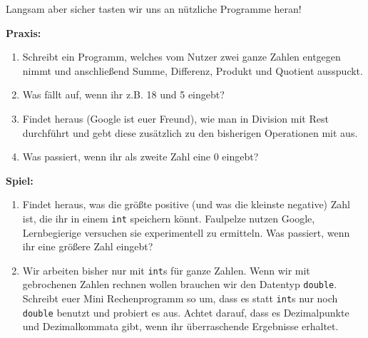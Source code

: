 
Langsam aber sicher tasten wir uns an nützliche Programme heran!

\textbf{Praxis:}
\begin{enumerate}[resume]
    \item Schreibt ein Programm, welches vom Nutzer zwei ganze Zahlen entgegen
        nimmt und anschließend Summe, Differenz, Produkt und Quotient
        ausspuckt.
    \item Was fällt auf, wenn ihr z.B. 18 und 5 eingebt?
    \item Findet heraus (Google ist euer Freund), wie man in \Cpp Division mit
        Rest durchführt und gebt diese zusätzlich zu den bisherigen Operationen
        mit aus.
    \item Was passiert, wenn ihr als zweite Zahl eine 0 eingebt?
\end{enumerate}

\textbf{Spiel:}
\begin{enumerate}
    \item Findet heraus, was die größte positive (und was die kleinste
        negative) Zahl ist, die ihr in einem \texttt{int} speichern könnt.
        Faulpelze nutzen Google, Lernbegierige versuchen sie experimentell zu
        ermitteln. Was passiert, wenn ihr eine größere Zahl eingebt?
    \item Wir arbeiten bisher nur mit \texttt{int}s für ganze Zahlen. Wenn wir
        mit gebrochenen Zahlen rechnen wollen brauchen wir den Datentyp
        \texttt{double}. Schreibt euer Mini Rechenprogramm so um, dass es statt
        \texttt{int}s nur noch \texttt{double} benutzt und probiert es aus.
        Achtet darauf, dass es Dezimalpunkte und Dezimalkommata gibt, wenn ihr
        überraschende Ergebnisse erhaltet.
\end{enumerate}
